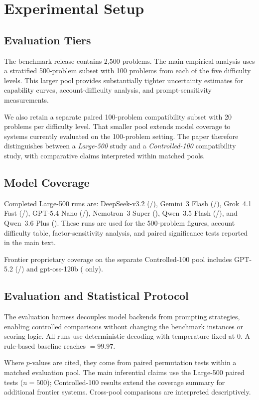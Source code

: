 \section{Experimental Setup}

\subsection{Evaluation Tiers}

The benchmark release contains 2{,}500 problems.
The main empirical analysis uses a stratified
500-problem subset with 100 problems from each of the five difficulty
levels.
This larger pool provides substantially tighter uncertainty estimates
for capability curves, account-difficulty analysis, and prompt-sensitivity
measurements.

We also retain a separate paired 100-problem compatibility subset with
20 problems per difficulty level.
That smaller pool extends model coverage to systems currently evaluated
on the 100-problem setting.
The paper therefore distinguishes between a \emph{Large-500} study and a
\emph{Controlled-100} compatibility study, with comparative claims
interpreted within matched pools.

\subsection{Model Coverage}

Completed Large-500 runs are:
DeepSeek-v3.2 (\zs{}/\CoT{}), Gemini~3 Flash (\zs{}/\CoT{}),
Grok~4.1 Fast (\zs{}/\CoT{}), GPT-5.4 Nano (\zs{}/\CoT{}),
Nemotron~3 Super (\zs{}),
Qwen~3.5 Flash (\zs{}/\CoT{}), and Qwen~3.6 Plus (\CoT{}).
These runs are used for the 500-problem figures, account
difficulty table, factor-sensitivity analysis, and paired significance
tests reported in the main text.

Frontier proprietary coverage on the separate Controlled-100 pool
includes GPT-5.2 (\zs{}/\CoT{}) and gpt-oss-120b (\zs{} only).

\subsection{Evaluation and Statistical Protocol}

The evaluation harness decouples model backends from prompting
strategies, enabling controlled comparisons without changing the
benchmark instances or scoring logic.
All runs use deterministic decoding with temperature fixed at \(0\).
A rule-based baseline reaches \fbs{} \(=99.97\).

Where \(p\)-values are cited, they come from paired permutation tests
within a matched evaluation pool.
The main inferential claims use the Large-500 paired tests (\(n=500\));
Controlled-100 results extend the coverage summary for additional
frontier systems.
Cross-pool comparisons are interpreted descriptively.
